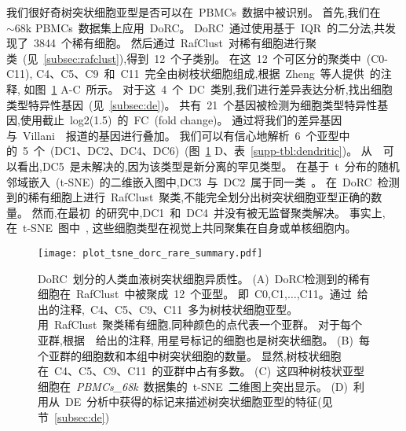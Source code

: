我们很好奇树突状细胞亚型是否可以在~PBMCs~数据中被识别。
首先,我们在~${\sim}68$k PBMCs~数据集上应用~DoRC。
DoRC~通过使用基于~IQR~的二分法,共发现了~3844~个稀有细胞。
然后通过~RafClust~对稀有细胞进行聚类~(见~\ref{subsec:rafclust}),得到~12~个子类别。
在这~12~个可区分的聚类中~(C0-C11),
C4、C5、C9~和~C11~完全由树枝状细胞组成,根据~Zheng~等人提供~\cite{zheng2017massively}的注释,
如图~\ref{fig:dorc_dendritic} A-C~所示。
对于这~4~个~DC~类别,我们进行差异表达分析,找出细胞类型特异性基因~(见~\ref{subsec:de})。
共有~21~个基因被检测为细胞类型特异性基因,使用截止~log2(1.5)~的~FC~(fold change)。
通过将我们的差异基因与~Villani~\cite{villani2017single}~报道的基因进行叠加。
我们可以有信心地解析~6~个亚型中的~5~个~(DC1、DC2、DC4、DC6)~(图~\ref{fig:dorc_dendritic} D、表~\ref{supp-tbl:dendritic})。
从~\cite{villani2017single}~可以看出,DC5~是未解决的,因为该类型是新分离的罕见类型。
在基于~t~分布的随机邻域嵌入~(t-SNE)~的二维嵌入图中,DC3~与~DC2~属于同一类~\cite{maaten2008visualizing}。
在~DoRC~检测到的稀有细胞上进行~RafClust~聚类,不能完全划分出树突状细胞亚型正确的数量。
然而,在最初~\cite{zheng2017massively}的研究中,DC1~和~DC4~并没有被无监督聚类解决。
事实上,在~t-SNE~图中~\cite{zheng2017massively},
这些细胞类型在视觉上共同聚集在自身或单核细胞内。
\begin{figure}[!htbp]
    \centering
    \texttt{[image: plot\_tsne\_dorc\_rare\_summary.pdf]}
    \caption{
    DoRC~划分的人类血液树突状细胞异质性。
    (A)~DoRC检测到的稀有细胞在~RafClust~中被聚成~12~个亚型。
    即~C0,C1,$\ldots$,C11。通过~\cite{zheng2017massively}给出的注释,~C4、C5、C9、C11~多为树枝状细胞亚型。
    用~RafClust~聚类稀有细胞,同种颜色的点代表一个亚群。
    对于每个亚群,根据~\cite{zheng2017massively}~给出的注释,
    用星号标记的细胞也是树突状细胞。
    (B)~每个亚群的细胞数和本组中树突状细胞的数量。
    显然,树枝状细胞在~C4、C5、C9、C11~的亚群中占有多数。
    (C)~这四种树枝状亚型细胞在~\textit{PBMCs\_68k}~数据集的~t-SNE~二维图上突出显示。
    (D)~利用从~DE~分析中获得的标记来描述树突状细胞亚型的特征(见节~\ref{subsec:de})
    }
    \label{fig:dorc_dendritic}
\end{figure}

